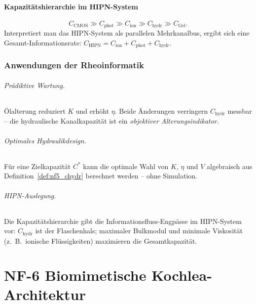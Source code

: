 ﻿\documentclass[a4paper,12pt]{scrreprt}
\theoremstyle{definition}
\begin{document}
\subsection{Kapazitätshierarchie im HIPN-System}

\[
  C_{\mathrm{CMOS}} \gg C_{\mathrm{phot}} \gg C_{\mathrm{ion}}
  \gg C_{\mathrm{hydr}} \gg C_{\mathrm{Gel}}.
\]
Interpretiert man das HIPN-System als parallelen Mehrkanalbus,
ergibt sich eine Gesamt-Informationsrate:
$C_{\mathrm{HIPN}} = C_{\mathrm{ion}} + C_{\mathrm{phot}} +
C_{\mathrm{hydr}}.$

\section{Anwendungen der Rheoinformatik}

\paragraph{Prädiktive Wartung.} Ölalterung reduziert $K$ und erhöht
$\eta$. Beide Änderungen verringern $C_{\mathrm{hydr}}$ messbar --
die hydraulische Kanalkapazität ist ein \emph{objektiver
Alterungsindikator}.

\paragraph{Optimales Hydraulikdesign.} Für eine Zielkapazität
$C^*$ kann die optimale Wahl von $K$, $\eta$ und $V$ algebraisch
aus Definition~\ref{def:nf5_chydr} berechnet werden -- ohne
Simulation.

\paragraph{HIPN-Auslegung.} Die Kapazitätshierarchie gibt die
Informationsfluss-Engpässe im HIPN-System vor:
$C_{\mathrm{hydr}}$ ist der Flaschenhals; maximaler Bulkmodul
und minimale Viskosität (z.\ B.\ ionische Flüssigkeiten) maximieren
die Gesamtkapazität.

\part{NF-6 \quad Biomimetische Kochlea-Architektur}
\label{part:nf6}
\end{document}

